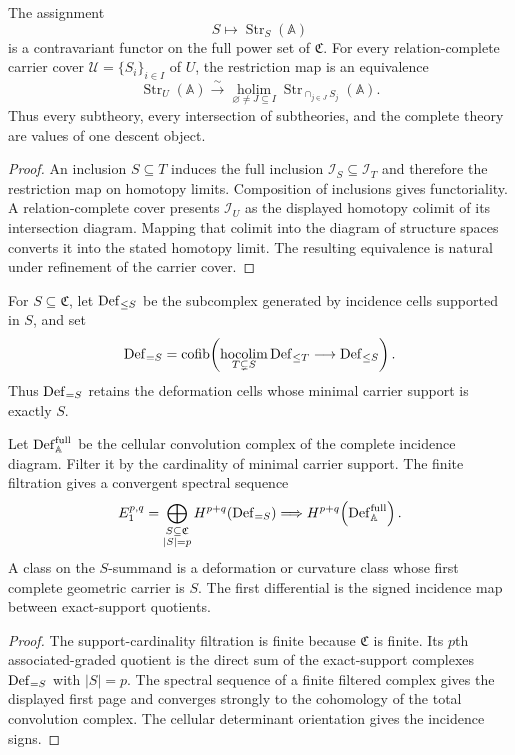 \begin{theorem}
The assignment
\[
 S\longmapsto\operatorname{Str}_S(\mathbb A)
\]
is a contravariant functor on the full power set of $\mathfrak C$.  For every relation-complete carrier cover $\mathcal U=\{S_i\}_{i\in I}$ of $U$, the restriction map is an equivalence
\[
 \operatorname{Str}_U(\mathbb A)
 \xrightarrow{\sim}
 \underset{\varnothing\ne J\subseteq I}{\operatorname{holim}}
 \operatorname{Str}_{\cap_{j\in J}S_j}(\mathbb A).
\]
Thus every subtheory, every intersection of subtheories, and the complete theory are values of one descent object.
\end{theorem}
\begin{proof}
An inclusion $S\subseteq T$ induces the full inclusion $\mathcal I_S\subseteq\mathcal I_T$ and therefore the restriction map on homotopy limits.  Composition of inclusions gives functoriality.  A relation-complete cover presents $\mathcal I_U$ as the displayed homotopy colimit of its intersection diagram.  Mapping that colimit into the diagram of structure spaces converts it into the stated homotopy limit.  The resulting equivalence is natural under refinement of the carrier cover.
\end{proof}

\begin{definition}
For $S\subseteq\mathfrak C$, let $\operatorname{Def}_{\leq S}$ be the subcomplex generated by incidence cells supported in $S$, and set
\[
 \operatorname{Def}_{=S}
 =\operatorname{cofib}\!\left(
   \underset{T\subsetneq S}{\operatorname{hocolim}}
   \operatorname{Def}_{\leq T}
   \longrightarrow
   \operatorname{Def}_{\leq S}
 \right).
\]
Thus $\operatorname{Def}_{=S}$ retains the deformation cells whose minimal carrier support is exactly $S$.
\end{definition}

\begin{theorem}
Let $\operatorname{Def}_{\mathbb A}^{\mathrm{full}}$ be the cellular convolution complex of the complete incidence diagram.  Filter it by the cardinality of minimal carrier support.  The finite filtration gives a convergent spectral sequence
\[
 E_1^{p,q}
 =\bigoplus_{\substack{S\subseteq\mathfrak C\\|S|=p}}
 H^{p+q}(\operatorname{Def}_{=S})
 \Longrightarrow
 H^{p+q}\!\left(\operatorname{Def}_{\mathbb A}^{\mathrm{full}}\right).
\]
A class on the $S$-summand is a deformation or curvature class whose first complete geometric carrier is $S$.  The first differential is the signed incidence map between exact-support quotients.
\end{theorem}
\begin{proof}
The support-cardinality filtration is finite because $\mathfrak C$ is finite.  Its $p$th associated-graded quotient is the direct sum of the exact-support complexes $\operatorname{Def}_{=S}$ with $|S|=p$.  The spectral sequence of a finite filtered complex gives the displayed first page and converges strongly to the cohomology of the total convolution complex.  The cellular determinant orientation gives the incidence signs.
\end{proof}

